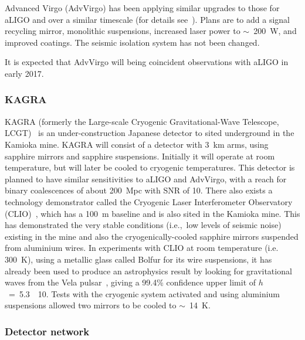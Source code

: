 Advanced Virgo (AdvVirgo) has been applying similar upgrades to those for aLIGO and over a similar timescale
(for details see~\cite{2015CQGra..32b4001A, AdvVirgoWhitepaper, AdvVirgoDesign}). Plans are
to add a signal recycling mirror, monolithic suspensions, increased laser power to $\sim$~200~W, and
improved coatings. The seismic isolation system has not been changed.

It is expected that AdvVirgo will being coincident observations with aLIGO in early 2017.

\subsubsection{KAGRA}

KAGRA (formerly the Large-scale Cryogenic Gravitational-Wave Telescope,
LCGT)~\cite{2013PhRvD..88d3007A, Miyoki:2005, Ohashi:2008, Kuroda:2010} is an under-construction Japanese detector to
sited underground in the Kamioka mine. KAGRA will consist of a detector with 3~km arms, using
sapphire mirrors and sapphire suspensions. Initially it will operate at room temperature,
but will later be cooled to cryogenic
temperatures. This detector is planned to have similar sensitivities
to aLIGO and AdvVirgo, with a reach for binary coalescences of about 200~Mpc
with SNR of 10. There also exists a technology demonstrator called the
Cryogenic Laser Interferometer Observatory (CLIO)~\cite{Yamamoto:2008, CLIOweb},
which has a 100~m baseline and is also sited in the Kamioka mine. This has
demonstrated the very stable conditions (i.e.,\ low levels of seismic noise)
existing in the mine and also the cryogenically-cooled sapphire mirrors
suspended from aluminium wires. In experiments with CLIO at room temperature
(i.e.\, 300~K), using a metallic glass called Bolfur for its wire suspensions, it
has already been used to produce an astrophysics result by looking for
gravitational waves from the Vela pulsar~\cite{Akutsu:2008}, giving a 99.4\%
confidence upper limit of $h$~=~5.3~\texttimes~10. Tests with the cryogenic
system activated and using aluminium suspensions allowed two mirrors to be
cooled to $\sim$~14~K.

\subsubsection{Detector network}

